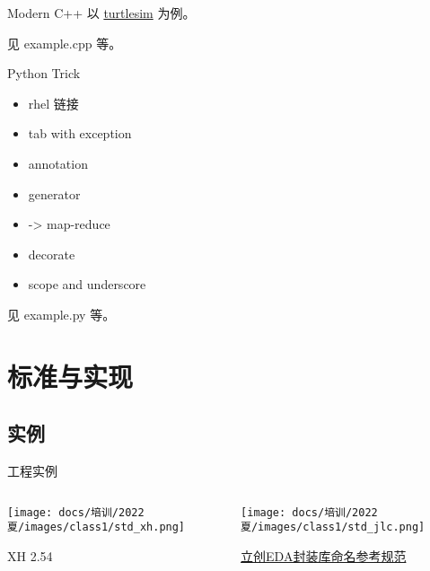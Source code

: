 \begin{frame}{Modern C++} %
    以 \href{https://github.com/ros/ros_tutorials/blob/humble/turtlesim/src/turtle_frame.cpp}{turtlesim} 为例。
    
    见 example.cpp 等。
\end{frame}

\begin{frame}{Python Trick} %
    \begin{itemize}
        \item rhel 链接
        \item tab with exception
        \item annotation
        \item generator
        \item -> map-reduce
        \item decorate
        \item scope and underscore
    \end{itemize}
    
    见 example.py 等。
\end{frame}

\section{标准与实现}

\subsection{实例}

\begin{frame}{工程实例}
    \begin{columns}
    \begin{column}{.5\textwidth}
    \centering
    \texttt{[image: docs/培训/2022夏/images/class1/std\_xh.png]}
    
    XH 2.54
    \end{column}
    \begin{column}{.5\textwidth}
    \centering
    \texttt{[image: docs/培训/2022夏/images/class1/std\_jlc.png]}
    
    \href{https://shimo.im/docs/0765b0f4a4704ecb/read}{立创EDA封装库命名参考规范}
    \end{column}
    \end{columns}
\end{frame}

